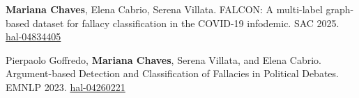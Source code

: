 \documentclass[10pt,a4paper,ragged2e,withhyper]{altacv}
\begin{document}
\begin{paracol}{2}

\begin{justify}
  \vspace{-1em}
  \textbf{Mariana Chaves}, Elena Cabrio, Serena Villata. FALCON: A multi-label graph-based dataset for fallacy classification in the COVID-19 infodemic. SAC 2025. \href{https://hal.science/hal-04834405v1}{hal-04834405}
\end{justify}

\vspace{1mm}

\begin{justify}
  \vspace{-1em}
  Pierpaolo Goffredo, \textbf{Mariana Chaves}, Serena Villata, and Elena Cabrio. Argument-based Detection and Classification of Fallacies in Political Debates. EMNLP 2023. \href{https://inria.hal.science/hal-04260221}{hal-04260221}
\end{justify}







\end{paracol}
\end{document}
